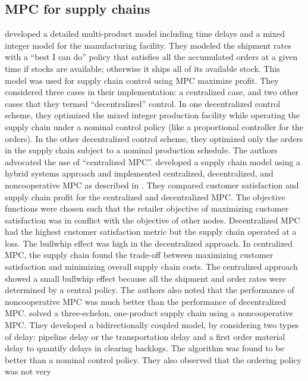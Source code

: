 \subsection*{MPC for supply chains}
\citet{perealopez:ydstie:grossmann:2003} developed a detailed
multi-product model including time delays and a mixed integer model
for the manufacturing facility. They modeled the shipment rates with a
``best I can do'' policy that satisfies all the accumulated orders at
a given time if stocks are available; otherwise it ships all of its
available stock. This  model was used for supply chain
control using MPC maximize profit. They considered three cases in
their implementation: a 
centralized case, and two other cases that they termed
``decentralized'' control. In one decentralized control scheme, they
optimized the mixed integer production facility while operating the
supply chain under a nominal control policy (like a proportional
controller for the orders). In the other decentralized control
scheme, they optimized only the orders in the supply chain subject to
a nominal production schedule. The authors advocated the use of
``centralized MPC''. \citet{mestan:turkay:arkun:2006} developed a
supply chain model using a 
hybrid systems approach and implemented  centralized,
decentralized, and noncooperative MPC as described in
\citep{rawlings:stewart:2008}. They compared customer satisfaction and
supply chain profit for the centralized and decentralized
MPC. The objective functions were chosen such that the retailer
objective of maximizing customer satisfaction was in conflict with the
objective of other nodes. Decentralized MPC had the highest customer satisfaction metric
but the supply chain operated at a loss. The bullwhip effect was high in the decentralized approach. In
centralized MPC, the supply chain found the trade-off between
maximizing customer satisfaction  and minimizing overall supply chain 
costs. The  centralized approach showed a small bullwhip effect because all the shipment and
order rates were determined by a central policy. The authors also
noted that the performance of noncooperative MPC was much better than
the performance of decentralized MPC.  \citet{dunbar:desa:2007a} solved a three-echelon, one-product supply
chain using a noncooperative MPC.  They developed a bidirectionally coupled model, by considering two
types of delay: pipeline delay or the transportation delay and
a first order material delay to quantify delays in clearing
backlogs.  The algorithm was found to be better than a nominal control
policy. They also observed  that the ordering policy was not very
